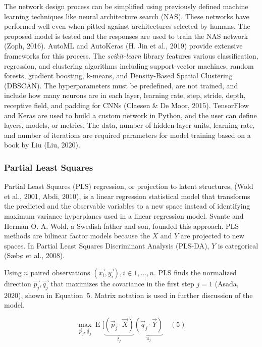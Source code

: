 \documentclass[sn-mathphys-num]{sn-jnl}%
\begin{document}
The network design process can be simplified using previously defined machine learning techniques like neural architecture search (NAS). These networks have performed well even when pitted against architectures selected by humans. The proposed model is tested and the responses are used to train the NAS network (Zoph, 2016). AutoML and AutoKeras (H. Jin et al., 2019) provide extensive frameworks for this process. The \textit{scikit-learn} library features various classification, regression, and clustering algorithms including support-vector machines, random forests, gradient boosting, k-means, and Density-Based Spatial Clustering (DBSCAN). The hyperparameters must be predefined, are not trained, and include how many neurons are in each layer, learning rate, step, stride, depth, receptive field, and padding for CNNs (Claesen & De Moor, 2015). TensorFlow and Keras are used to build a custom network in Python, and the user can define layers, models, or metrics. The data, number of hidden layer units, learning rate, and number of iterations are required parameters for model training based on a book by Liu (Liu, 2020).

\subsubsection{Partial Least Squares}

Partial Least Squares (PLS) regression, or projection to latent structures, (Wold et al., 2001, Abdi, 2010), is a linear regression statistical model that transforms the predicted and the observable variables to a new space instead of identifying maximum variance hyperplanes used in a linear regression model. Svante and Herman O. A. Wold, a Swedish father and son, founded this approach. PLS methods are bilinear factor models because the $X$ and $Y$ are projected to new spaces. In Partial Least Squares Discriminant Analysis (PLS-DA), $Y$ is categorical (Sæbø et al., 2008).

Using $n$ paired observations $\left(\vec{x_{i}}, \vec{y_{i}}\right), i \in 1, \dots, n$. PLS finds the normalized direction $\vec{p_{j}}, \vec{q_{j}}$ that maximizes the covariance in the first step $j = 1$ (Asada, 2020), shown in Equation~5. Matrix notation is used in further discussion of the model.

\begin{equation}
	\max_{{\vec{p}}_{j},{\vec{q}}_{j}}\operatorname{E} [\underbrace{({\vec{p}}_{j}\cdot {\vec{X}})}_{t_{j}}\underbrace{({\vec{q}}_{j}\cdot {\vec{Y}})}_{u_{j}}
	\quad\left(5\right)
\end{equation}
\end{document}
